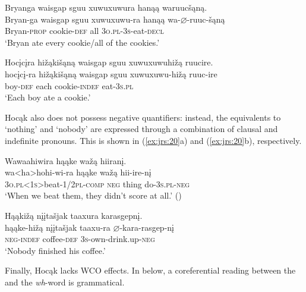 \documentclass[output=paper]{LSP/langsci}
\begin{document}
\begin{exe}
\ex\label{ex:jrs:19}	
\begin{xlist}	
\ex
\glll Bryanga {waisgap sguu xuwuxuwura} 	hanąą 	waruuc\v{s}ąną.\\
Bryan-ga 	{waisgap sguu xuwuxuwu-ra} 	hanąą 	wa-$\varnothing$-ruuc-\v{s}ąną \\
	Bryan-\textsc{prop} 	cookie-\textsc{def}	all 		\textsc{3o.pl-3s}-eat-\textsc{decl} \\
\trans `Bryan ate every cookie/all of the cookies.'

\ex 
\glll Hoc\k{i}c\k{i}ra 	hi\v{z}ąki\v{s}ąną 	{waisgap sguu xuwuxuwuhi\v{z}ą }		ruucire.\\
hoc\k{i}c\k{i}-ra 	hi\v{z}ąki\v{s}ąną 	{waisgap sguu xuwuxuwu-hi\v{z}ą }		ruuc-ire \\
	boy-\textsc{def} 		each 					cookie-\textsc{indef}		eat-\textsc{3s.pl}\\
\trans `Each boy ate a cookie.'
\end{xlist}
\end{exe}

 
Hocąk also does not possess negative quantifiers: instead, the equivalents to `nothing' and `nobody' are expressed through a combination of clausal  and indefinite pronouns. This is shown in (\ref{ex:jrs:20}a) and (\ref{ex:jrs:20}b), respectively.
 
\ea\label{ex:jrs:20}
\ea\label{ex:jrs:20a)}
\glll Wawaahiwira 	hąąke 	wa\v{z}ą 	hiiran\k{i}. \\
wa<ha>hohi-wi-ra 						hąąke 	wa\v{z}ą 	hii-ire-n\k{i} \\
	\textsc{3o.pl<1s>}beat-\textsc{1/2pl}-\textsc{comp} \textsc{neg}		thing 	do-\textsc{3s.pl-neg} \\
\trans `When we beat them, they didn't score at all.' (\citealt{Hartmann2012}) 

\ex \label{ex:jrs:20b}
\glll Hąąki\v{z}ą 	{n\k{i}\k{i}ta\v{s}jak taaxura} 	karasgepn\k{i}. \\
hąąke-hi\v{z}ą  {n\k{i}\k{i}ta\v{s}jak taaxu-ra }	$\varnothing$-kara-rasgep-n\k{i} \\
	\textsc{neg-indef} 	coffee-\textsc{def}	\textsc{3s}-own-drink.up-\textsc{neg} \\
\trans `Nobody finished his coffee.'
\z 
\z 
	
Finally, Hocąk lacks WCO effects. In  below, a coreferential reading between the  and the  \textit{wh}-word is grammatical.
\end{document}
